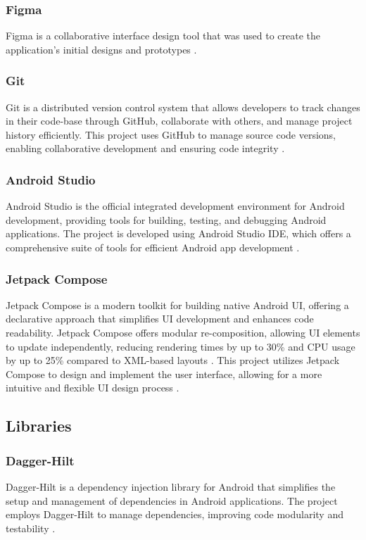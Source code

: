 \subsubsection{Figma}
Figma is a collaborative interface design tool that was used to create the application's initial designs and prototypes \cite{bib:figma}.

\subsubsection{Git}
Git is a distributed version control system that allows developers to track changes in their code-base through GitHub, collaborate with others, and manage project history efficiently. This project uses GitHub to manage source code versions, enabling collaborative development and ensuring code integrity \cite{bib:git}.

\subsubsection{Android Studio}
Android Studio is the official integrated development environment for Android development, providing tools for building, testing, and debugging Android applications. The project is developed using Android Studio IDE, which offers a comprehensive suite of tools for efficient Android app development \cite{bib:androidstudio}.

\subsubsection{Jetpack Compose}
Jetpack Compose is a modern toolkit for building native Android UI, offering a declarative approach that simplifies UI development and enhances code readability. Jetpack Compose offers modular re-composition, allowing UI elements to update independently, reducing rendering times by up to 30\% and CPU usage by up to 25\% compared to XML-based layouts \cite{bib:peerD}. This project utilizes Jetpack Compose to design and implement the user interface, allowing for a more intuitive and flexible UI design process \cite{bib:jetpackcompose}.

\subsection{Libraries}

\subsubsection{Dagger-Hilt}
Dagger-Hilt is a dependency injection library for Android that simplifies the setup and management of dependencies in Android applications. The project employs Dagger-Hilt to manage dependencies, improving code modularity and testability \cite{bib:daggerhilt}.

